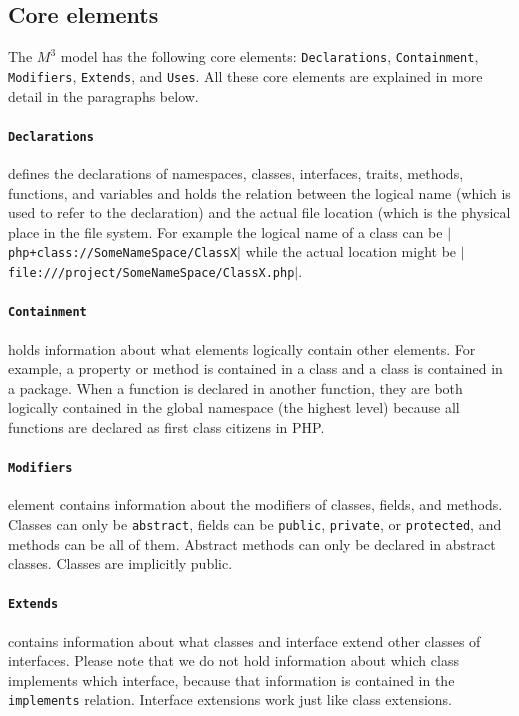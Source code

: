 \documentclass[../main.tex]{subfiles}
\begin{document}
    \subsection{Core elements}
    The $M^3$ model has the following core elements: \texttt{Declarations}, \texttt{Containment}, \texttt{Modifiers}, \texttt{Extends}, and \texttt{Uses}.
    All these core elements are explained in more detail in the paragraphs below.
    
    \paragraph{\texttt{Declarations}} defines the declarations of namespaces, classes, interfaces, traits, methods, functions, and variables and holds the relation between the logical name (which is used to refer to the declaration) and the actual file location (which is the physical place in the file system.
    For example the logical name of a class can be \texttt{$\vert$php+class://SomeNameSpace/ClassX$\vert$} while the actual location might be \texttt{$\vert$file:///project/SomeNameSpace/ClassX.php$\vert$}.
    
    \paragraph{\texttt{Containment}} holds information about what elements logically contain other elements.
    For example, a property or method is contained in a class and a class is contained in a package.
    When a function is declared in another function, they are both logically contained in the global namespace (the highest level) because all functions are declared as first class citizens in PHP.
    
    \paragraph{\texttt{Modifiers}} element contains information about the modifiers of classes, fields, and methods. 
    Classes can only be \texttt{abstract}, fields can be \texttt{public}, \texttt{private}, or \texttt{protected}, and methods can be all of them. 
    Abstract methods can only be declared in abstract classes. 
    Classes are implicitly public.
    
    \paragraph{\texttt{Extends}} contains information about what classes and interface extend other classes of interfaces. 
    Please note that we do not hold information about which class implements which interface, because that information is contained in the \texttt{implements} relation.
    Interface extensions work just like class extensions.
    
\end{document}
